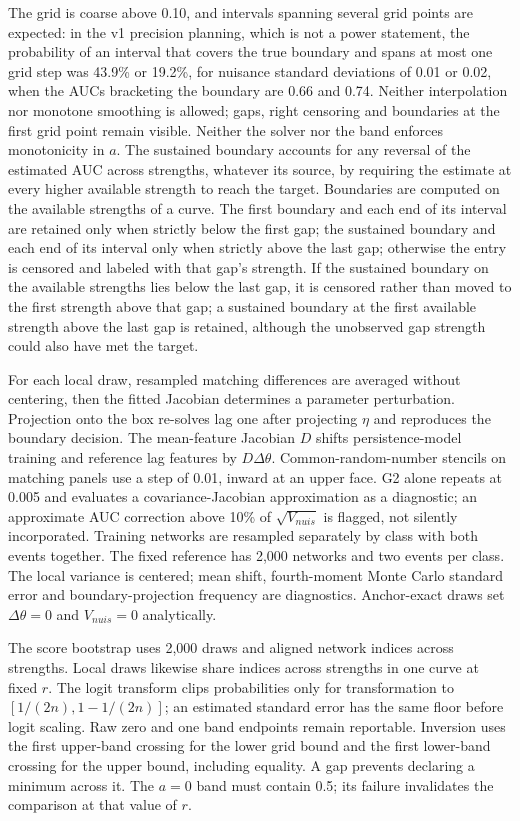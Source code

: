 The grid is coarse above 0.10, and intervals spanning several grid points are expected: in the v1 precision planning, which is not a power statement, the probability of an interval that covers the true boundary and spans at most one grid step was 43.9\% or 19.2\%, for nuisance standard deviations of 0.01 or 0.02, when the AUCs bracketing the boundary are 0.66 and 0.74. Neither interpolation nor monotone smoothing is allowed; gaps, right censoring and boundaries at the first grid point remain visible. Neither the solver nor the band enforces monotonicity in $a$. The sustained boundary accounts for any reversal of the estimated AUC across strengths, whatever its source, by requiring the estimate at every higher available strength to reach the target. Boundaries are computed on the available strengths of a curve. The first boundary and each end of its interval are retained only when strictly below the first gap; the sustained boundary and each end of its interval only when strictly above the last gap; otherwise the entry is censored and labeled with that gap's strength. If the sustained boundary on the available strengths lies below the last gap, it is censored rather than moved to the first strength above that gap; a sustained boundary at the first available strength above the last gap is retained, although the unobserved gap strength could also have met the target.

For each local draw, resampled matching differences are averaged without centering, then the fitted Jacobian determines a parameter perturbation. Projection onto the box re-solves lag one after projecting $\eta$ and reproduces the boundary decision. The mean-feature Jacobian $D$ shifts persistence-model training and reference lag features by $D\Delta\theta$. Common-random-number stencils on matching panels use a step of 0.01, inward at an upper face. G2 alone repeats at 0.005 and evaluates a covariance-Jacobian approximation as a diagnostic; an approximate AUC correction above 10\% of $\sqrt{V_{nuis}}$ is flagged, not silently incorporated. Training networks are resampled separately by class with both events together. The fixed reference has 2,000 networks and two events per class. The local variance is centered; mean shift, fourth-moment Monte Carlo standard error and boundary-projection frequency are diagnostics. Anchor-exact draws set $\Delta\theta=0$ and $V_{nuis}=0$ analytically.

The score bootstrap uses 2,000 draws and aligned network indices across strengths. Local draws likewise share indices across strengths in one curve at fixed $r$. The logit transform clips probabilities only for transformation to $[1/(2n),1-1/(2n)]$; an estimated standard error has the same floor before logit scaling. Raw zero and one band endpoints remain reportable. Inversion uses the first upper-band crossing for the lower grid bound and the first lower-band crossing for the upper bound, including equality. A gap prevents declaring a minimum across it. The $a=0$ band must contain 0.5; its failure invalidates the comparison at that value of $r$. %

